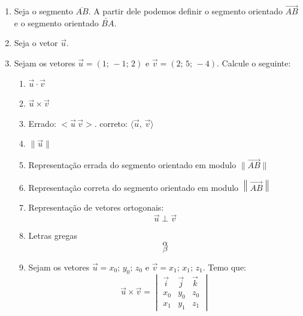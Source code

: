 \documentclass[a4paper,12pt]{article}
\begin{document}
   \begin{enumerate}
      \item Seja o segmento $\overline{AB}$. A partir dele podemos definir o segmento orientado $\overrightarrow{AB}$  e o segmento orientado $\overleftarrow{BA}$.
      \item Seja o vetor $\vec{u}$.
      \item Sejam os vetores $\vec{u}=(1;\,-1;\,2) \text{ e } \vec{v} = (2;\,5;\, -4)$.
      Calcule o seguinte:
      \begin{enumerate}
         \item $\vec{u} \cdot \vec{v}$
         \item $\vec{u} \times \vec{v}$
         \item Errado: $<\vec{u}\,\vec{v}>$. correto: $\langle\vec{u},\,\vec{v}\rangle$
         \item $\|\vec{u}\|$
         \item Representação errada do segmento orientado em modulo $\|\overrightarrow{AB}\|$
         \item Representação correta do segmento orientado em modulo $\left\|\overrightarrow{AB}\right\|$
         \item Representação de vetores ortogonais: $$\vec{u} \perp \vec{v}$$
         \item Letras gregas $$\alpha$$ $$\beta$$
         \item Sejam os vetores $\vec{u} = {x_0;\, y_0;\, z_0}$ e $\vec{v}={x_1;\, x_1;\, z_1}$. Temo que:$$
         \vec{u} \times \vec{v} = \begin{vmatrix}
         \vec{i} & \vec{j} & \vec{k}\\ x_0 & y_0 & z_0 \\ x_1 & y_1 & z_1
         \end{vmatrix}$$
         
      \end{enumerate}
   \end{enumerate}
\end{document}

